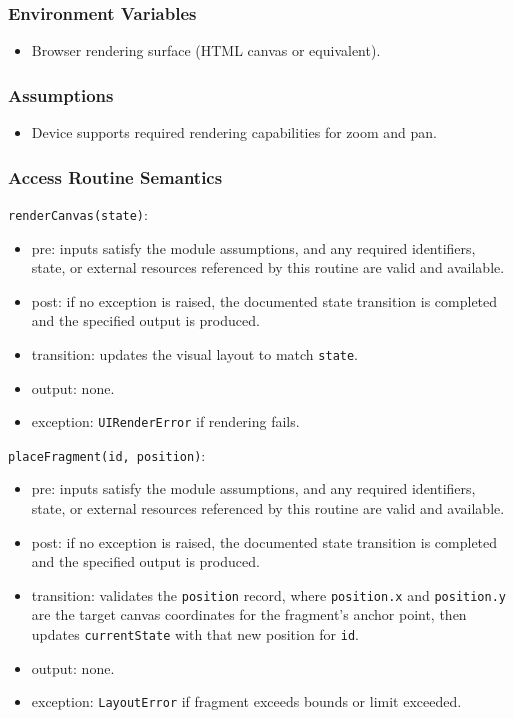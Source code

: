 \documentclass[12pt, titlepage]{article}
\begin{document}
\subsubsection{Environment Variables}
\begin{itemize}
    \item Browser rendering surface (HTML canvas or equivalent).
\end{itemize}

\subsubsection{Assumptions}
\begin{itemize}
    \item Device supports required rendering capabilities for zoom and pan.
\end{itemize}

\subsubsection{Access Routine Semantics}

\noindent \texttt{renderCanvas(state)}:
\begin{itemize}
    \item pre: inputs satisfy the module assumptions, and any required identifiers, state, or external resources referenced by this routine are valid and available.
    \item post: if no exception is raised, the documented state transition is completed and the specified output is produced.
    \item transition: updates the visual layout to match \texttt{state}.
    \item output: none.
    \item exception: \texttt{UIRenderError} if rendering fails.
\end{itemize}

\noindent \texttt{placeFragment(id, position)}:
\begin{itemize}
    \item pre: inputs satisfy the module assumptions, and any required identifiers, state, or external resources referenced by this routine are valid and available.
    \item post: if no exception is raised, the documented state transition is completed and the specified output is produced.
    \item transition: validates the \texttt{position} record, where \texttt{position.x} and \texttt{position.y} are the target canvas coordinates for the fragment's anchor point, then updates \texttt{currentState} with that new position for \texttt{id}.
    \item output: none.
    \item exception: \texttt{LayoutError} if fragment exceeds bounds or limit exceeded.
\end{itemize}
\end{document}
